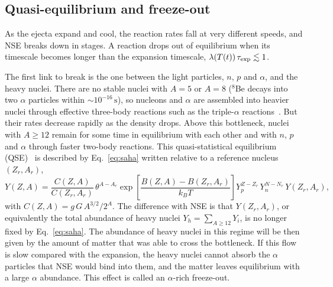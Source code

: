 \subsection{Quasi-equilibrium and freeze-out}\label{sec:freezeout}
 
As the ejecta expand and cool, the reaction rates fall at very different speeds, and NSE breaks down in stages.
A reaction drops out of equilibrium when its timescale becomes longer than the expansion timescale, $\lambda(T(t))\,\tau_{\rm exp}\lesssim1$.

The first link to break is the one between the light particles, $n$, $p$ and $\alpha$, and the heavy nuclei.
There are no stable nuclei with $A=5$ or $A=8$ (${}^8$Be decays into two $\alpha$ particles within $\sim10^{-16}\,\mathrm{s}$), so nucleons and $\alpha$ are assembled into heavier nuclei through effective three-body reactions such as the triple-$\alpha$ reactions~\cite{woosley_alpha_1992}.
But their rates decrease rapidly as the density drops.
Above this bottleneck, nuclei with $A\geq12$ remain for some time in equilibrium with each other and with $n$, $p$ and $\alpha$ through faster two-body reactions.
This quasi-statistical equilibrium (QSE)~\cite{meyer_theory_1998} is described by Eq.~\ref{eq:saha} written relative to a reference nucleus $(Z_r,A_r)$,
\begin{equation}\label{eq:qse}
  Y(Z,A)=\frac{C(Z,A)}{C(Z_r,A_r)}\,\theta^{A-A_r}\exp\left[\frac{B(Z,A)-B(Z_r,A_r)}{k_BT}\right]Y_p^{Z-Z_r}\,Y_n^{N-N_r}\,Y(Z_r,A_r),
\end{equation}
with $C(Z,A)=g\,G\,A^{3/2}/2^A$.
The difference with NSE is that $Y(Z_r,A_r)$, or equivalently the total abundance of heavy nuclei $Y_h=\sum_{A\geq12}Y_i$, is no longer fixed by Eq.~\ref{eq:saha}.
The abundance of heavy nuclei in this regime will be then given by the amount of matter that was able to cross the bottleneck.
If this flow is slow compared with the expansion, the heavy nuclei cannot absorb the $\alpha$ particles that NSE would bind into them, and the matter leaves equilibrium with a large $\alpha$ abundance.
This effect is called an $\alpha$-rich freeze-out.
 
